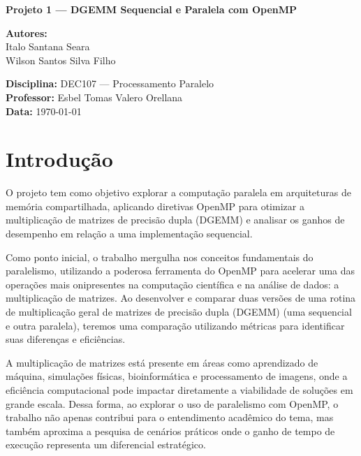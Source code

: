 \documentclass[12pt, a4paper]{article}
\begin{document}
	\begin{titlepage}
		\centering
		\vspace*{2cm}

		{\huge\bfseries Projeto 1 — DGEMM Sequencial e Paralela com OpenMP\par}
		\vspace{1.5cm}

		{\Large \textbf{Autores:}\\ Italo Santana Seara\\ Wilson Santos Silva Filho\\ }

		\vspace{2cm}

		{\large \textbf{Disciplina:} DEC107 — Processamento Paralelo\\ \textbf{Professor:} Esbel Tomas Valero Orellana\\ \textbf{Data:} \today\\ }

		\vfill
	\end{titlepage}

	\tableofcontents

	\newpage
	\section{Introdução}

	O projeto tem como objetivo explorar a computação paralela em arquiteturas de memória
	compartilhada, aplicando diretivas OpenMP para otimizar a multiplicação de
	matrizes de precisão dupla (DGEMM) e analisar os ganhos de desempenho em
	relação a uma implementação sequencial.

	Como ponto inicial, o trabalho mergulha nos conceitos fundamentais do paralelismo,
	utilizando a poderosa ferramenta do OpenMP para acelerar uma das operações
	mais onipresentes na computação científica e na análise de dados: a multiplicação
	de matrizes. Ao desenvolver e comparar duas versões de uma rotina de
	multiplicação geral de matrizes de precisão dupla (DGEMM) (uma sequencial e outra
	paralela), teremos uma comparação utilizando métricas para identificar suas
	diferenças e eficiências.

	A multiplicação de matrizes está presente em áreas como aprendizado de máquina,
	simulações físicas, bioinformática e processamento de imagens, onde a eficiência
	computacional pode impactar diretamente a viabilidade de soluções em grande escala.
	Dessa forma, ao explorar o uso de paralelismo com OpenMP, o trabalho não
	apenas contribui para o entendimento acadêmico do tema, mas também aproxima a pesquisa
	de cenários práticos onde o ganho de tempo de execução representa um diferencial
	estratégico.
\end{document}
